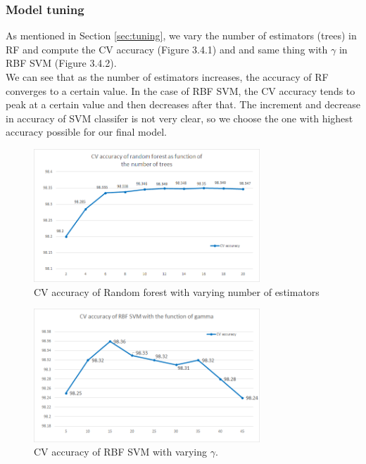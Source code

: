 \documentclass{article}
\begin{document}
\subsubsection{Model tuning}
As mentioned in Section \ref{sec:tuning}, we vary the number of estimators (trees) in RF and compute the CV accuracy (Figure 3.4.1) and and same thing with $\gamma$ in RBF SVM (Figure 3.4.2).\\
We can see that as the number of estimators increases, the accuracy of RF converges to a certain value. In the case of RBF SVM, the CV accuracy tends to peak at a certain value and then decreases after that. The increment and decrease in accuracy of SVM classifer is not very clear, so we choose the one with highest accuracy possible for our final model.

\begin{figure}[htb]
\begin{minipage}[b]{1.0\linewidth}
  \centering
  \centerline{\includegraphics[width=8.5cm]{RFestimator.png}}
\end{minipage}
\label{fig:RFestimator}
\caption{CV accuracy of Random forest with varying number of estimators}
\end{figure}
\begin{figure}[htb]
\begin{minipage}[b]{1.0\linewidth}
  \centering
  \centerline{\includegraphics[width=8.5cm]{RBFSVMgamma.png}}
\end{minipage}
\label{fig:RBFSVMgamma}
\caption{CV accuracy of RBF SVM with varying $\gamma$.}
\end{figure}
\end{document}
